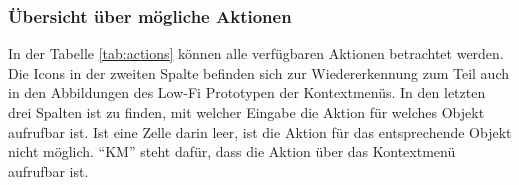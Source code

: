 \subsubsection*{Übersicht über mögliche Aktionen}

In der Tabelle \ref{tab:actions} können alle verfügbaren Aktionen betrachtet werden. Die Icons in der zweiten Spalte befinden sich zur Wiedererkennung zum Teil auch in den Abbildungen des Low-Fi Prototypen der Kontextmenüs. In den letzten drei Spalten ist zu finden, mit welcher Eingabe die Aktion für welches Objekt aufrufbar ist. Ist eine Zelle darin leer, ist die Aktion für das entsprechende Objekt nicht möglich. "`KM"' steht dafür, dass die Aktion über das Kontextmenü aufrufbar ist.

\renewcommand\tabularxcolumn[1]{m{#1}}
\newcommand{\icon}[1]{\vspace{-8px}\texttt{[image: figures/icons/\#1]}}
